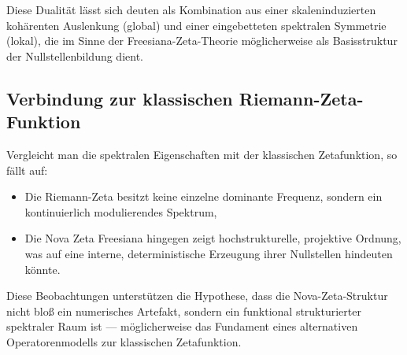 Diese Dualität lässt sich deuten als Kombination aus einer skaleninduzierten kohärenten Auslenkung (global) und einer eingebetteten spektralen Symmetrie (lokal), die im Sinne der Freesiana-Zeta-Theorie möglicherweise als Basisstruktur der Nullstellenbildung dient.

\subsection{Verbindung zur klassischen Riemann-Zeta-Funktion}

Vergleicht man die spektralen Eigenschaften mit der klassischen Zetafunktion, so fällt auf:
\begin{itemize}
  \item Die Riemann-Zeta besitzt keine einzelne dominante Frequenz, sondern ein kontinuierlich modulierendes Spektrum,
  \item Die Nova Zeta Freesiana hingegen zeigt hochstrukturelle, projektive Ordnung, was auf eine interne, deterministische Erzeugung ihrer Nullstellen hindeuten könnte.
\end{itemize}

Diese Beobachtungen unterstützen die Hypothese, dass die Nova-Zeta-Struktur nicht bloß ein numerisches Artefakt, sondern ein funktional strukturierter spektraler Raum ist --- möglicherweise das Fundament eines alternativen Operatorenmodells zur klassischen Zetafunktion.
